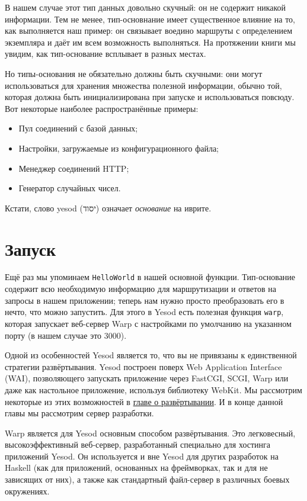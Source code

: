 В нашем случае этот тип данных довольно скучный: он не содержит никакой информации. Тем не
менее, тип-основнание имеет существенное влияние на то, как выполняется наш пример: он
связывает воедино маршруты с определением экземпляра и даёт им всем возможность
выполняться. На протяжении книги мы увидим, как тип-основание всплывает в разных местах.

Но типы-основания не обязательно должны быть скучными: они могут использоваться для
хранения множества полезной информации, обычно той, которая должна быть инициализирована
при запуске и использоваться повсюду. Вот некоторые наиболее распространённые примеры:

\begin{itemize}
  \item Пул соединений с базой данных;
  \item Настройки, загружаемые из конфигурационного файла;
  \item Менеджер соединений HTTP;
  \item Генератор случайных чисел.
\end{itemize}

\begin{remark}
    Кстати, слово yesod (\textsf{יסוד}) означает \emph{основание} на иврите.
\end{remark}

\section{Запуск}

Ещё раз мы упоминаем \lstinline!HelloWorld! в нашей основной функции. Тип-основание
содержит всю необходимую информацию для маршрутизации и ответов на запросы в нашем
приложении; теперь нам нужно просто преобразовать его в нечто, что можно запустить. Для
этого в Yesod есть полезная функция \lstinline!warp!, которая запускает веб-сервер
Warp с настройками по умолчанию на указанном порту (в нашем случае это 3000).

Одной из особенностей Yesod является то, что вы не привязаны к единственной стратегии
развёртывания. Yesod построен поверх Web Application Interface (WAI), позволяющего
запускать приложение через FastCGI, SCGI, Warp или даже как настольное приложение,
используя библиотеку WebKit. Мы рассмотрим некоторые из этих возможностей в
\hyperref[chap:deploying]{главе о развёртывании}. И в конце данной главы мы рассмотрим сервер
разработки.

Warp является для Yesod основным способом развёртывания. Это легковесный,
высокоэффективный веб-сервер, разработанный специально для хостинга приложений Yesod. Он
используется и вне Yesod для других разработок на Haskell (как для приложений, основанных
на фреймворках, так и для не зависящих от них), а также как стандартный файл-сервер в
различных боевых окружениях.

